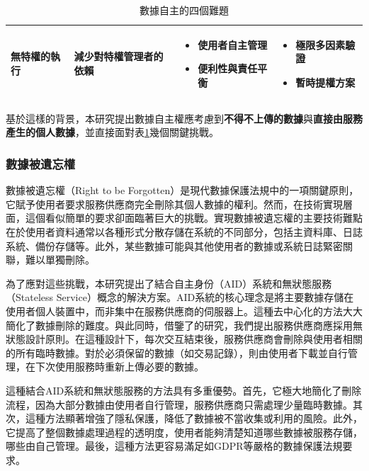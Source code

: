 \begin{table}
\begin{tabular}{>{\raggedright\arraybackslash}p{2.5cm}>{\raggedright\arraybackslash}p{2.5cm}>{\raggedright\arraybackslash}p{4cm}>{\raggedright\arraybackslash}p{4cm}}
    \addlinespace
    無特權的執行                              & 減少對特權管理者的依賴       &
    \begin{itemize}[nosep,leftmargin=*]
      \item 使用者自主管理
      \item 便利性與責任平衡
    \end{itemize} &
    \begin{itemize}[nosep,leftmargin=*]
      \item 極限多因素驗證
      \item 暫時提權方案
    \end{itemize}                                                        \\
    \bottomrule
  \end{tabular}
  \caption{數據自主的四個難題}
  \label{tab:aid-data-difficult}
\end{table}
基於這樣的背景，本研究提出數據自主權應考慮到\textbf{不得不上傳的數據}與\textbf{直接由服務產生的個人數據}，並直接面對表\ref{tab:aid-data-difficult}幾個關鍵挑戰。
\subsubsection{數據被遺忘權}
數據被遺忘權（Right to be Forgotten）是現代數據保護法規中的一項關鍵原則，它賦予使用者要求服務供應商完全刪除其個人數據的權利。然而，在技術實現層面，這個看似簡單的要求卻面臨著巨大的挑戰。實現數據被遺忘權的主要技術難點在於使用者資料通常以各種形式分散存儲在系統的不同部分，包括主資料庫、日誌系統、備份存儲等\cite{smirnova2024understanding}。此外，某些數據可能與其他使用者的數據或系統日誌緊密關聯，難以單獨刪除。

為了應對這些挑戰，本研究提出了結合自主身份（AID）系統和無狀態服務（Stateless Service）概念的解決方案。AID系統的核心理念是將主要數據存儲在使用者個人裝置中，而非集中在服務供應商的伺服器上。這種去中心化的方法大大簡化了數據刪除的難度。與此同時，借鑒了\cite{krstic2023cloud_encryption}的研究，我們提出服務供應商應採用無狀態設計原則。在這種設計下，每次交互結束後，服務供應商會刪除與使用者相關的所有臨時數據。對於必須保留的數據（如交易記錄），則由使用者下載並自行管理，在下次使用服務時重新上傳必要的數據。

這種結合AID系統和無狀態服務的方法具有多重優勢。首先，它極大地簡化了刪除流程，因為大部分數據由使用者自行管理，服務供應商只需處理少量臨時數據。其次，這種方法顯著增強了隱私保護，降低了數據被不當收集或利用的風險。此外，它提高了整個數據處理過程的透明度，使用者能夠清楚知道哪些數據被服務存儲，哪些由自己管理。最後，這種方法更容易滿足如GDPR等嚴格的數據保護法規要求。

